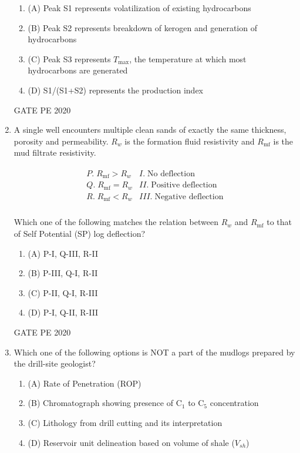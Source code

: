 \documentclass[journal,12pt,onecolumn]{IEEEtran}
\theoremstyle{remark}
\begin{document}
\begin{enumerate}
  
\begin{enumerate}
\item (A) Peak S1 represents volatilization of existing hydrocarbons
\item (B) Peak S2 represents breakdown of kerogen and generation of hydrocarbons
\item (C) Peak S3 represents $T_{\text{max}}$, the temperature at which most hydrocarbons are generated
\item (D) S1/(S1+S2) represents the production index
\end{enumerate}

  \hfill{GATE PE 2020}
   
\item A single well encounters multiple clean sands of exactly the same thickness, porosity and permeability. $R_w$ is the formation fluid resistivity and $R_{\text{mf}}$ is the mud filtrate resistivity.

\begin{align}
\begin{array}{ll}
P.\; R_{\text{mf}} > R_w & I.\; \text{No deflection} \\
Q.\; R_{\text{mf}} = R_w & II.\; \text{Positive deflection} \\
R.\; R_{\text{mf}} < R_w & III.\; \text{Negative deflection} \\
\end{array}
\end{align}


Which one of the following matches the relation between $R_w$ and $R_{\text{mf}}$ to that of Self Potential (SP) log deflection?

  
\begin{multicols}{2}
\begin{enumerate}
\item (A) P-I, Q-III, R-II
\item (B) P-III, Q-I, R-II
\item (C) P-II, Q-I, R-III
\item (D) P-I, Q-II, R-III
\end{enumerate}
\end{multicols}


  \hfill{GATE PE 2020}
   
\item Which one of the following options is NOT a part of the mudlogs prepared by the drill-site geologist?

  
\begin{enumerate}
\item (A) Rate of Penetration (ROP)
\item (B) Chromatograph showing presence of C$_1$ to C$_5$ concentration
\item (C) Lithology from drill cutting and its interpretation
\item (D) Reservoir unit delineation based on volume of shale ($V_{sh}$)
\end{enumerate}



\end{enumerate}
\end{document}

